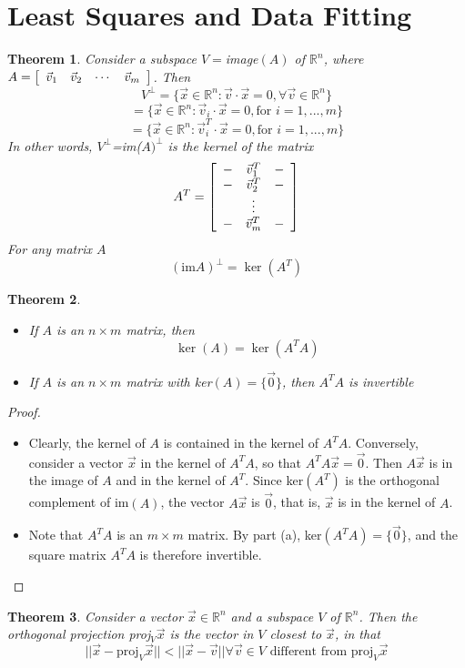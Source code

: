 \documentclass[10pt]{report}
\newtheorem{thm2}{Theorem}[section]
\begin{document}
\section{Least Squares and Data Fitting}
\begin{thm2}
Consider a subspace $V=$image$(A)$ of $\mathbb{R}^n$, where $A=\left[\begin{array}{c c c c}
\vec{v}_1 & \vec{v}_2 & \cdots & \vec{v}_m
\end{array}\right]$. Then
$$V^\perp = \{\vec{x}\in \mathbb{R}^n:\vec{v}\cdot \vec{x} = 0, \forall \vec{v}\in \mathbb{R}^n\}$$
$$= \{\vec{x}\in \mathbb{R}^n:\vec{v}_i\cdot \vec{x} = 0, \text{for }i=1,...,m\}$$
$$= \{\vec{x}\in \mathbb{R}^n:\vec{v}_i^T\cdot \vec{x} = 0, \text{for }i=1,...,m\}$$
In other words, $V^\perp$=im($A)^\perp$ is the kernel of the matrix
$$A^T = \left[\begin{array}{c c c}
- & \vec{v}_1^T & -\\
- & \vec{v}_2^T & -\\
& \vdots & \\
- & \vec{v}_m^T & -
\end{array}\right]$$
For any matrix $A$
$$(\text{im}A)^\perp = \ker(A^T)$$
\end{thm2}
\begin{thm2}
\begin{itemize}
\item[a.] If $A$ is an $n\times m$ matrix, then
$$\ker(A)=\ker(A^TA)$$
\item[b.] If $A$ is an $n\times m$ matrix with ker$(A)=\{\vec{0}\}$, then $A^TA$ is invertible
\end{itemize}
\end{thm2}
\begin{proof}
\begin{itemize}
\item[a.] Clearly, the kernel of $A$ is contained in the kernel of $A^TA$. Conversely, consider a vector $\vec{x}$ in the kernel of $A^TA$, so that $A^TA\vec{x}=\vec{0}$. Then $A\vec{x}$ is in the image of $A$ and in the kernel of $A^T$. Since ker$(A^T)$ is the orthogonal complement of im$(A)$, the vector $A\vec{x}$ is $\vec{0}$, that is, $\vec{x}$ is in the kernel of $A$.
\item[b.] Note that $A^TA$ is an $m\times m$ matrix. By part (a), ker$(A^TA)=\{\vec{0}\}$, and the square matrix $A^TA$ is therefore invertible.
\end{itemize}
\end{proof}
\begin{thm2}
Consider a vector $\vec{x} \in \mathbb{R}^n$ and a subspace $V$ of $\mathbb{R}^n$. Then the orthogonal projection proj$_V\vec{x}$ is the vector in $V$ closest to $\vec{x}$, in that
$$||\vec{x}-\text{proj}_V\vec{x}||<||\vec{x}-\vec{v}|| \forall \vec{v}\in V \text{ different from proj}_V\vec{x}$$
\end{thm2}
\end{document}
